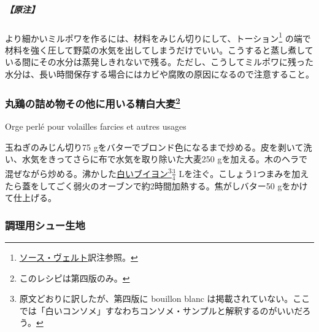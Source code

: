 \begin{recette}
\hypertarget{nota-mirepoix-fine}{%
\subparagraph{【原注】}\label{nota-mirepoix-fine}}

より細かいミルポワを作るには、材料をみじん切りにして、トーション\footnote{\protect\hyperlink{sauce-verte}{ソース・ヴェルト}訳注参照。}
の端で材料を強く圧して野菜の水気を出してしまうだけでいい。こうすると蒸し煮している間にその水分は蒸発しきれないで残る。ただし、こうしてミルポワに残った水分は、長い時間保存する場合にはカビや腐敗の原因になるので注意すること。

\atoaki{}

\hypertarget{orge-perle-pour-volailles-farcies}{%
\subsubsection[丸鶏の詰め物その他に用いる精白大麦]{\texorpdfstring{丸鶏の詰め物その他に用いる精白大麦\footnote{このレシピは第四版のみ。}}{丸鶏の詰め物その他に用いる精白大麦}}\label{orge-perle-pour-volailles-farcies}}

\begin{frsubenv}

Orge perlé pour volailles farcies et autres usages

\end{frsubenv}


玉ねぎのみじん切り75
gをバターでブロンド色になるまで炒める。皮を剥いて洗い、水気をきってさらに布で水気を取り除いた大麦250
gを加える。木のヘラで混ぜながら炒める。沸かした\protect\hyperlink{consomme-blanc}{白いブイヨン}\footnote{原文どおりに訳したが、第四版に
  bouillon blanc
  は掲載されていない。ここでは「白いコンソメ」すなわちコンソメ・サンプルと解釈するのがいいだろう。}\(\frac{3}{4}\)
Lを注ぐ。こしょう1つまみを加えたら蓋をしてごく弱火のオーブンで約2時間加熱する。焦がしバター50
gをかけて仕上げる。

\atoaki{}

\hypertarget{pate-a-chou-d-office}{%
\subsubsection{調理用シュー生地}\label{pate-a-chou-d-office}}

\begin{frsubenv}


\end{frsubenv}
\end{recette}
